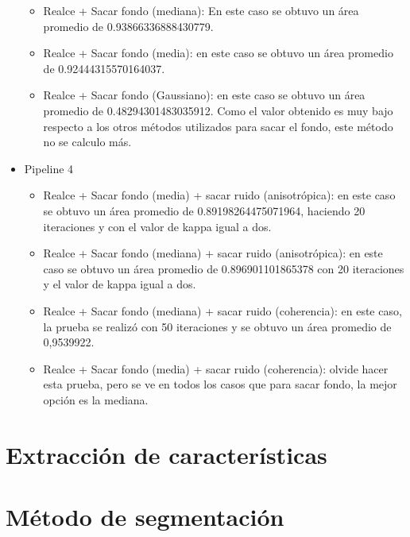 \begin{itemize}
\begin{itemize}
			\item Realce + Sacar fondo (mediana): En este caso se obtuvo un área promedio de 0.93866336888430779.
			\item Realce + Sacar fondo (media): en este caso se obtuvo un área promedio de 0.92444315570164037.
			\item Realce + Sacar fondo (Gaussiano): en este caso se obtuvo un área promedio de 0.48294301483035912. Como el valor obtenido es muy bajo respecto a los otros métodos utilizados para sacar el fondo, este método no se calculo más.
		\end{itemize}
	\item Pipeline 4
		\begin{itemize}
			\item Realce + Sacar fondo (media) + sacar ruido (anisotrópica): en este caso se obtuvo un área promedio de 0.89198264475071964, haciendo 20 iteraciones y con el valor de kappa igual a dos.
			\item Realce + Sacar fondo (mediana) + sacar ruido (anisotrópica): en este caso se obtuvo un área promedio de 0.896901101865378 con 20 iteraciones y el valor de kappa igual a dos.
			\item Realce + Sacar fondo (mediana) + sacar ruido (coherencia): en este caso, la prueba se realizó con 50 iteraciones y se obtuvo un área promedio de 0,9539922.
			\item Realce + Sacar fondo (media) + sacar ruido (coherencia): olvide hacer esta prueba, pero se ve en todos los casos que para sacar fondo, la mejor opción es la mediana.
		\end{itemize}
\end{itemize}



\section{Extracci\'on de caracter\'isticas}



\section{M\'etodo de segmentaci\'on}


